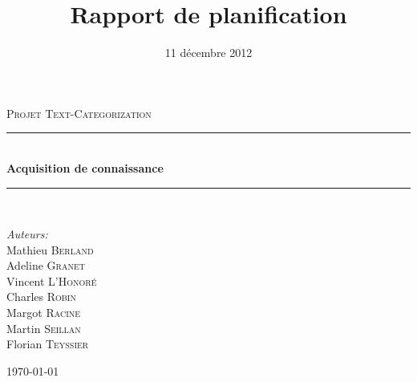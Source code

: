 \documentclass[a4paper]{article}
\title{Rapport de planification}
\date{11 décembre 2012}
\newcommand{\HRule}{\rule{\linewidth}{0.5mm}}
\begin{document}

\begin{titlepage}

\begin{center}



\textsc{\Large Projet Text-Categorization}\\[0.5cm]


\HRule \\[0.4cm]
{ \huge \bfseries Acquisition de connaissance}\\[0.4cm]

\HRule \\[1.5cm]

\begin{minipage}{0.4\textwidth}
\begin{flushleft} \large
\emph{Auteurs:}\\
Mathieu \textsc{Berland}\\
Adeline \textsc{Granet}\\
Vincent \textsc{L'Honoré}\\
Charles \textsc{Robin}\\
Margot \textsc{Racine}\\
Martin \textsc{Seillan}\\
Florian \textsc{Teyssier}\\
\end{flushleft}
\end{minipage}
\begin{minipage}{0.4\textwidth}
\begin{flushright} \large
\end{flushright}
\end{minipage}

\vfill

{\large \today}
\end{center}

\end{titlepage}






\tableofcontents
\newpage


\newpage
\end{document}
